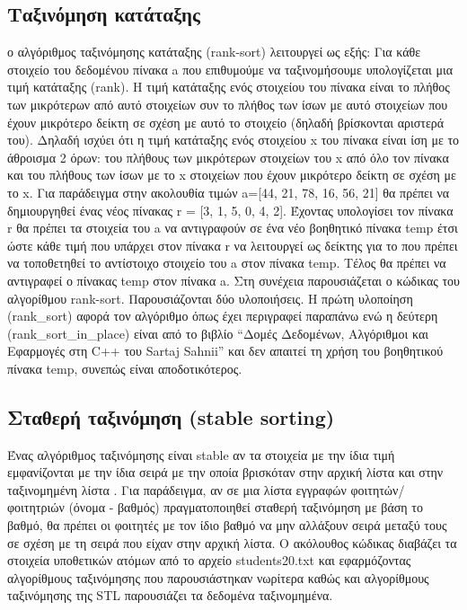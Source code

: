 \subsection{Ταξινόμηση κατάταξης}
ο αλγόριθμος ταξινόμησης κατάταξης (rank-sort) λειτουργεί ως εξής: Για κάθε στοιχείο του δεδομένου πίνακα a που επιθυμούμε να ταξινομήσουμε υπολογίζεται μια τιμή κατάταξης (rank). Η τιμή κατάταξης ενός στοιχείου του πίνακα είναι το πλήθος των μικρότερων από αυτό στοιχείων συν το πλήθος των ίσων με αυτό στοιχείων που έχουν μικρότερο δείκτη σε σχέση με αυτό το στοιχείο (δηλαδή βρίσκονται αριστερά του).  Δηλαδή ισχύει ότι η τιμή κατάταξης ενός στοιχείου x του πίνακα είναι ίση με το άθροισμα 2 όρων: του πλήθους των μικρότερων στοιχείων του x από όλο τον πίνακα  και του πλήθους των ίσων με το x στοιχείων που έχουν μικρότερο δείκτη σε σχέση με το x. Για παράδειγμα στην ακολουθία τιμών a=[44, 21, 78, 16, 56, 21] θα πρέπει να δημιουργηθεί ένας νέος πίνακας r = [3, 1, 5, 0, 4, 2]. Έχοντας υπολογίσει τον πίνακα r θα πρέπει τα στοιχεία του a να αντιγραφούν σε ένα νέο βοηθητικό πίνακα temp έτσι ώστε κάθε τιμή που υπάρχει στον πίνακα r να λειτουργεί ως δείκτης για το που πρέπει να τοποθετηθεί το αντίστοιχο στοιχείο του a στον πίνακα temp. Τέλος θα πρέπει να αντιγραφεί ο πίνακας temp στον πίνακα a.
Στη συνέχεια παρουσιάζεται ο κώδικας του αλγορίθμου rank-sort. Παρουσιάζονται δύο υλοποιήσεις. Η πρώτη υλοποίηση (rank\_sort) αφορά τον αλγόριθμο όπως έχει περιγραφεί παραπάνω ενώ η δεύτερη (rank\_sort\_in\_place) είναι από το βιβλίο ``Δομές Δεδομένων, Αλγόριθμοι και Εφαρμογές στη C++ του Sartaj Sahnii'' \cite{sahnii2004} και δεν απαιτεί τη χρήση του βοηθητικού πίνακα temp, συνεπώς είναι αποδοτικότερος. 





\subsection{Σταθερή ταξινόμηση (stable sorting)}
Ένας αλγόριθμος ταξινόμησης είναι stable αν τα στοιχεία με την ίδια τιμή εμφανίζονται με την ίδια σειρά με την οποία βρισκόταν στην αρχική λίστα και στην ταξινομημένη λίστα \cite{hackernoon}. Για παράδειγμα, αν σε μια λίστα εγγραφών φοιτητών/φοιτητριών (όνομα - βαθμός) πραγματοποιηθεί σταθερή ταξινόμηση με βάση το βαθμό, θα πρέπει οι φοιτητές με τον ίδιο βαθμό να μην αλλάξουν σειρά μεταξύ τους σε σχέση με τη σειρά που είχαν στην αρχική λίστα. Ο ακόλουθος κώδικας διαβάζει τα στοιχεία υποθετικών ατόμων από το αρχείο students20.txt και εφαρμόζοντας αλγορίθμους ταξινόμησης που παρουσιάστηκαν νωρίτερα καθώς και αλγορίθμους ταξινόμησης της STL παρουσιάζει τα δεδομένα ταξινομημένα. 


